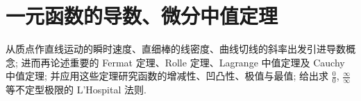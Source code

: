 
\chapter{一元函数的导数、微分中值定理}\label{ch:3}

从质点作直线运动的瞬时速度、直细棒的线密度、曲线切线的斜率出发引进导数概念; 进而再论述重要的 Fermat 定理、Rolle 定理、Lagrange 中值定理及 Cauchy 中值定理; 并应用这些定理研究函数的增减性、凹凸性、极值与最值; 给出求 $\frac{0}{0}$, $\frac{\infty}{\infty}$ 等不定型极限的 L'Hospital 法则.








